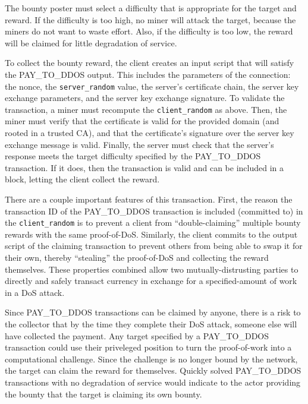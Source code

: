 The bounty poster must select a difficulty that is appropriate for the target
and reward. If the difficulty is too high, no miner will attack the target,
because the miners do not want to waste effort. Also, if the difficulty is
too low, the reward will be claimed for little degradation of service.

To collect the bounty reward, the client creates an input script that will
satisfy the PAY\_TO\_DDOS output. This includes the parameters of the
connection: the nonce, the \texttt{server\_random} value, the server's
certificate chain, the server key exchange parameters, and the server key
exchange signature. To validate the transaction, a miner must recompute the
\texttt{client\_random} as above. Then, the miner must verify that the
certificate is valid for the provided domain (and rooted in a trusted CA), and
that the certificate's signature over the server key exchange message is valid.
Finally, the server must check that the server's response meets the target
difficulty specified by the PAY\_TO\_DDOS transaction. If it does, then the
transaction is valid and can be included in a block, letting the client collect
the reward.

There are a couple important features of this transaction. First, the reason the
transaction ID of the PAY\_TO\_DDOS transaction is included (committed to) in
the \texttt{client\_random} is to prevent a client from ``double-claiming''
multiple bounty rewards with the same proof-of-DoS. Similarly, the client
commits to the output script of the claiming transaction to
prevent others from being able to swap it for their own, thereby ``stealing'' the
proof-of-DoS and collecting the reward themselves. These properties combined allow two
mutually-distrusting parties to directly and safely transact currency in
exchange for a specified-amount of work in a DoS attack.



Since PAY\_TO\_DDOS transactions can be claimed by anyone, there is a risk to
the collector that by the time they complete their DoS attack, someone else will
have collected the payment. Any target specified by a PAY\_TO\_DDOS transaction
could use their priveleged position to turn the proof-of-work into a computational challenge.
Since the challenge is no longer bound by the network, the target can claim the reward for
themselves. Quickly solved PAY\_TO\_DDOS transactions with no degradation of service
would indicate to the actor providing the bounty that the target is claiming its own bounty.

